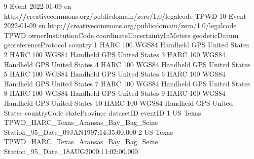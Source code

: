 \documentclass[
]{book}
\newenvironment{Shaded}{\begin{snugshade}}{\end{snugshade}}
\newcommand{\DecValTok}[1]{\textcolor[rgb]{0.00,0.00,0.81}{#1}}
\newcommand{\ErrorTok}[1]{\textcolor[rgb]{0.64,0.00,0.00}{\textbf{#1}}}
\newcommand{\FloatTok}[1]{\textcolor[rgb]{0.00,0.00,0.81}{#1}}
\newcommand{\NormalTok}[1]{#1}
\newcommand{\SpecialCharTok}[1]{\textcolor[rgb]{0.00,0.00,0.00}{#1}}
\begin{document}
\begin{Shaded}
\begin{Highlighting}[]
\DecValTok{9}\NormalTok{  Event }\DecValTok{2022{-}01{-}09}\NormalTok{       en http}\SpecialCharTok{:}\ErrorTok{//}\NormalTok{creativecommons.org}\SpecialCharTok{/}\NormalTok{publicdomain}\SpecialCharTok{/}\NormalTok{zero}\SpecialCharTok{/}\FloatTok{1.0}\SpecialCharTok{/}\NormalTok{legalcode            TPWD}
\DecValTok{10}\NormalTok{ Event }\DecValTok{2022{-}01{-}09}\NormalTok{       en http}\SpecialCharTok{:}\ErrorTok{//}\NormalTok{creativecommons.org}\SpecialCharTok{/}\NormalTok{publicdomain}\SpecialCharTok{/}\NormalTok{zero}\SpecialCharTok{/}\FloatTok{1.0}\SpecialCharTok{/}\NormalTok{legalcode            TPWD}
\NormalTok{   ownerInstitutionCode coordinateUncertaintyInMeters geodeticDatum georeferenceProtocol       country}
\DecValTok{1}\NormalTok{                  HARC                           }\DecValTok{100}\NormalTok{         WGS84         Handheld GPS United States}
\DecValTok{2}\NormalTok{                  HARC                           }\DecValTok{100}\NormalTok{         WGS84         Handheld GPS United States}
\DecValTok{3}\NormalTok{                  HARC                           }\DecValTok{100}\NormalTok{         WGS84         Handheld GPS United States}
\DecValTok{4}\NormalTok{                  HARC                           }\DecValTok{100}\NormalTok{         WGS84         Handheld GPS United States}
\DecValTok{5}\NormalTok{                  HARC                           }\DecValTok{100}\NormalTok{         WGS84         Handheld GPS United States}
\DecValTok{6}\NormalTok{                  HARC                           }\DecValTok{100}\NormalTok{         WGS84         Handheld GPS United States}
\DecValTok{7}\NormalTok{                  HARC                           }\DecValTok{100}\NormalTok{         WGS84         Handheld GPS United States}
\DecValTok{8}\NormalTok{                  HARC                           }\DecValTok{100}\NormalTok{         WGS84         Handheld GPS United States}
\DecValTok{9}\NormalTok{                  HARC                           }\DecValTok{100}\NormalTok{         WGS84         Handheld GPS United States}
\DecValTok{10}\NormalTok{                 HARC                           }\DecValTok{100}\NormalTok{         WGS84         Handheld GPS United States}
\NormalTok{   countryCode stateProvince                             datasetID                                eventID}
\DecValTok{1}\NormalTok{           US         Texas TPWD\_HARC\_Texas\_Aransas\_Bay\_Bag\_Seine Station\_95\_Date\_09JAN1997}\SpecialCharTok{:}\DecValTok{14}\SpecialCharTok{:}\DecValTok{35}\SpecialCharTok{:}\FloatTok{00.000}
\DecValTok{2}\NormalTok{           US         Texas TPWD\_HARC\_Texas\_Aransas\_Bay\_Bag\_Seine Station\_95\_Date\_18AUG2000}\SpecialCharTok{:}\DecValTok{11}\SpecialCharTok{:}\DecValTok{02}\SpecialCharTok{:}\FloatTok{00.000}

\end{Highlighting}
\end{Shaded}
\end{document}
